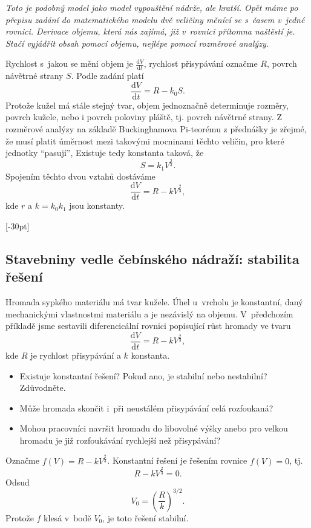 \textit{Toto je podobný model jako model vypouštění nádrže, ale kratší. Opět máme po přepisu zadání do matematického modelu dvě veličiny měnící se s časem v jedné rovnici. Derivace objemu, která nás zajímá, již v rovnici přítomna naštěstí je. Stačí vyjádřit obsah pomocí objemu, nejlépe pomocí rozměrové analýzy.}

\reseni
Rychlost s jakou se mění objem je $\frac{\mathrm dV}{\mathrm dt}$, rychlost přisypávání označme $R$, povrch návětrné strany $S$.
Podle zadání platí
$$  \frac{\mathrm dV}{\mathrm dt} = R - k_0S.$$
Protože kužel má stále stejný tvar, objem jednoznačně determinuje rozměry, povrch kužele, nebo i povrch poloviny pláště, tj. povrch návětrné strany. Z rozměrové analýzy na základě Buckinghamova Pi-teorému z přednášky je zřejmé, že musí platit úměrnost mezi takovými mocninami těchto veličin, pro které jednotky ``pasují'', Existuje tedy konstanta taková, že $$S=k_1V^{\frac 23}.$$ Spojením těchto dvou vztahů dostáváme
$$  \frac{\mathrm dV}{\mathrm dt} = R - k V^{\frac 23},$$
kde $r$ a $k=k_0k_1$ jsou konstanty.

\konec




[-30pt]

\subsection{Stavebniny vedle čebínského nádraží: stabilita řešení}

Hromada sypkého materiálu má tvar kužele. Úhel u~vrcholu je konstantní, daný
mechanickými vlastnostmi materiálu a je nezávislý na
objemu. V předchozím příkladě jsme sestavili diferencicální rovnici popisující růst hromady ve tvaru
$$\frac{\mathrm dV}{\mathrm dt}=R-kV^{\frac 23},$$
kde $R$ je rychlost přisypávání a $k$ konstanta.
\vspace*{25pt}
\begin{itemize}
\item Existuje konstantní řešení? Pokud ano, je stabilní nebo nestabilní? Zdůvodněte.
\item Může hromada skončit i při neustálém přisypávání celá rozfoukaná?
\item Mohou pracovníci navršit hromadu do libovolné výšky anebo pro velkou hromadu je již rozfoukávání rychlejší než přisypávání?
\end{itemize}

\reseni
Označme $f(V)=R-kV^{\frac 23}$.
Konstantní řešení je řešením rovnice $f(V)=0$, tj. $$R-kV^{\frac 23}=0.$$ Odsud
$$V_0=\left(\frac{R}{k}\right)^{3/2}.$$ Protože $f$ klesá v bodě $V_0$, je toto řešení stabilní.

